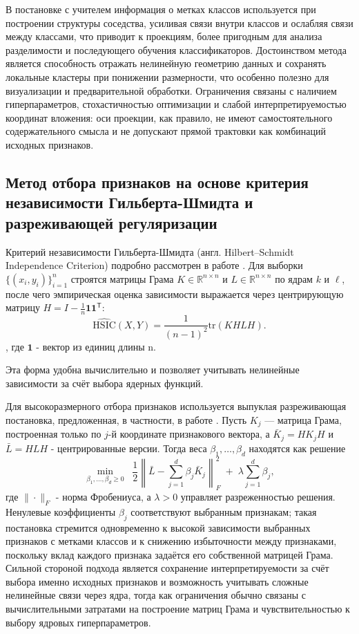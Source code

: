 \documentclass[12pt,a4paper]{article}
\begin{document}
В постановке с учителем информация о метках классов используется при построении структуры 
соседства, усиливая связи внутри классов и ослабляя связи между классами, что приводит к 
проекциям, более пригодным для анализа разделимости и последующего обучения классификаторов. 
Достоинством метода является способность отражать нелинейную геометрию данных и сохранять 
локальные кластеры при понижении размерности, что особенно полезно для визуализации и 
предварительной обработки. Ограничения связаны с наличием гиперпараметров, стохастичностью 
оптимизации и слабой интерпретируемостью координат вложения: оси проекции, как правило, 
не имеют самостоятельного содержательного смысла и не допускают прямой трактовки как комбинаций 
исходных признаков.

\subsection{Метод отбора признаков на основе критерия независимости Гильберта-Шмидта и 
разреживающей регуляризации}
Критерий независимости Гильберта-Шмидта (англ. Hilbert--Schmidt Independence Criterion) подробно рассмотрен в работе \cite{Gretton2005}. 
Для выборки $\{(x_i,y_i)\}_{i=1}^n$ строятся матрицы Грама $K \in \mathbb{R}^{n\times n}$ 
и $L \in \mathbb{R}^{n\times n}$ по ядрам $k$ и $\ell$, после чего эмпирическая оценка 
зависимости выражается через центрирующую матрицу 
$H = I - \frac{1}{n}\mathbf{1}\mathbf{1}^{\mathsf T}$:
\begin{equation}
\widehat{\mathrm{HSIC}}(X,Y) = \frac{1}{(n-1)^2}\mathrm{tr}(KHLH).
\end{equation}
, где $\mathbf{1}$ - вектор из единиц длины n.

Эта форма удобна вычислительно и позволяет учитывать нелинейные зависимости за счёт выбора 
ядерных функций.

Для высокоразмерного отбора признаков используется выпуклая разреживающая постановка, предложенная, 
в частности, в работе \cite{Yamada2014}. Пусть $K_j$ --- матрица Грама, построенная только 
по $j$-й координате признакового вектора, а $\bar{K}_j = HK_jH$ и $\bar{L}=HLH$ - 
центрированные версии. Тогда веса $\beta_1,\dots,\beta_d$ находятся как решение
\begin{equation}
\min_{\beta_1,\dots,\beta_d \ge 0}\;\; \frac{1}{2}\left\|\bar{L} - \sum_{j=1}^{d}\beta_j \bar{K}_j\right\|_F^2 \;+\; \lambda\sum_{j=1}^{d}\beta_j,
\end{equation}
где $\|\cdot\|_F$ - норма Фробениуса, а $\lambda>0$ управляет разреженностью 
решения. Ненулевые коэффициенты $\beta_j$ соответствуют выбранным признакам; такая постановка 
стремится одновременно к высокой зависимости выбранных признаков с метками классов и к снижению 
избыточности между признаками, поскольку вклад каждого признака задаётся его собственной 
матрицей Грама. Сильной стороной подхода является сохранение интерпретируемости за счёт 
выбора именно исходных признаков и возможность учитывать сложные нелинейные связи через ядра, 
тогда как ограничения обычно связаны с вычислительными затратами на построение матриц Грама и 
чувствительностью к выбору ядровых гиперпараметров.
\end{document}
